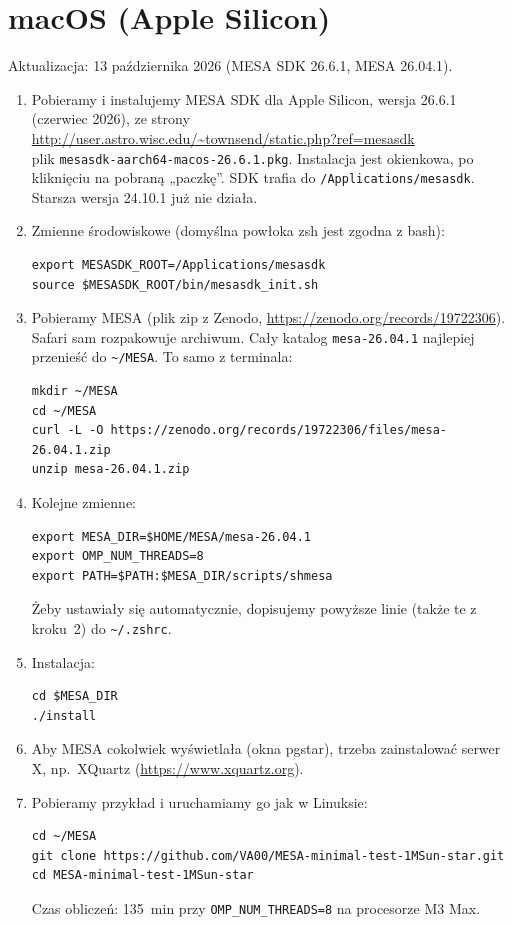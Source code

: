 \documentclass[11pt,a4paper]{article}
\begin{document}
\section{macOS (Apple Silicon)}\label{sec:mac}

Aktualizacja: 13 października 2026 (MESA SDK 26.6.1, MESA 26.04.1).

\begin{enumerate}
\item Pobieramy i instalujemy MESA SDK dla Apple Silicon, wersja 26.6.1 (czerwiec 2026), ze strony\\
  \url{http://user.astro.wisc.edu/~townsend/static.php?ref=mesasdk}\\
  plik \texttt{mesasdk-aarch64-macos-26.6.1.pkg}.
  Instalacja jest okienkowa, po kliknięciu na pobraną „paczkę”. SDK trafia do
  \verb!/Applications/mesasdk!. Starsza wersja 24.10.1 już nie działa.
\item Zmienne środowiskowe (domyślna powłoka zsh jest zgodna z bash):
\begin{verbatim}
export MESASDK_ROOT=/Applications/mesasdk
source $MESASDK_ROOT/bin/mesasdk_init.sh
\end{verbatim}
\item Pobieramy MESA (plik zip z Zenodo, \url{https://zenodo.org/records/19722306}). Safari sam
  rozpakowuje archiwum. Cały katalog \texttt{mesa-26.04.1} najlepiej przenieść do \verb!~/MESA!.
  To samo z terminala:
\begin{verbatim}
mkdir ~/MESA
cd ~/MESA
curl -L -O https://zenodo.org/records/19722306/files/mesa-26.04.1.zip
unzip mesa-26.04.1.zip
\end{verbatim}
\item Kolejne zmienne:
\begin{verbatim}
export MESA_DIR=$HOME/MESA/mesa-26.04.1
export OMP_NUM_THREADS=8
export PATH=$PATH:$MESA_DIR/scripts/shmesa
\end{verbatim}
  Żeby ustawiały się automatycznie, dopisujemy powyższe linie (także te z kroku~2) do
  \verb!~/.zshrc!.
\item Instalacja:
\begin{verbatim}
cd $MESA_DIR
./install
\end{verbatim}
\item Aby MESA cokolwiek wyświetlała (okna pgstar), trzeba zainstalować serwer X, np.~XQuartz
  (\url{https://www.xquartz.org}).
\item Pobieramy przykład i uruchamiamy go jak w Linuksie:
\begin{verbatim}
cd ~/MESA
git clone https://github.com/VA00/MESA-minimal-test-1MSun-star.git
cd MESA-minimal-test-1MSun-star
\end{verbatim}
  Czas obliczeń: 135~min przy \texttt{OMP\_NUM\_THREADS=8} na procesorze M3 Max.
\end{enumerate}
\end{document}
